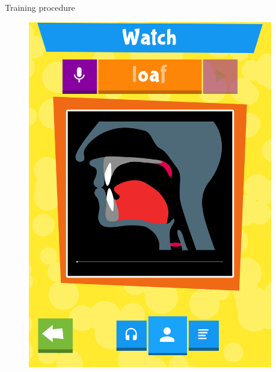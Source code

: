 \documentclass[final,xcolor={cmyk,hyperref}]{beamer}
\begin{document}
\begin{frame}[t]
\begin{columns}[t]
\begin{column}{0.4\linewidth}
\begin{block}{Training procedure}
\begin{figure}[h]
\begin{columns}
\begin{column}{\screenshotwidth}
    \includegraphics[width=\linewidth]{images/CALVin-screenshots/jpgs/vocal_tract_animation}
  \end{column}
  \begin{column}{\screenshotwidth}

\end{column}
\end{columns}
\end{figure}
\end{block}
\end{column}
\end{columns}
\end{frame}
\end{document}
